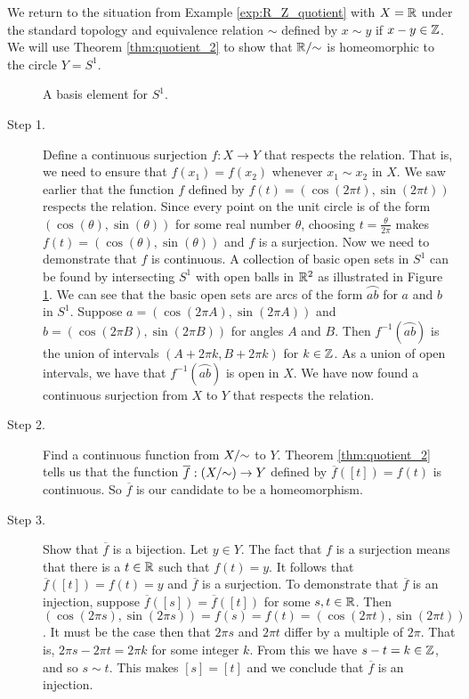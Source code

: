 \begin{example} We return to the situation from Example \ref{exp:R_Z_quotient} with $X = \mathbb{R}$ under the standard topology and equivalence relation $\sim$ defined by $x \sim y$ if $x - y \in \mathbb{Z}$. We will use Theorem \ref{thm:quotient_2} to show that $\mathbb{R}/\hspace{-1mm}\sim$ is homeomorphic to the circle $Y = S^1$. 

\begin{figure}[h]
\begin{center}
\caption{A basis element for $S^1$.} 
\label{F:S_1_basis}
\end{center}
\end{figure}


\begin{description}
\item[Step 1.] Define a continuous surjection $f: X \to Y$ that respects the relation. That is, we need to ensure that $f(x_1) = f(x_2)$ whenever $x_1 \sim x_2$ in $X$. We saw earlier that the function $f$ defined by $f(t) = (\cos(2 \pi t), \sin(2 \pi t))$ respects the relation. Since every point on the unit circle is of the form $(\cos(\theta), \sin(\theta))$ for some real number $\theta$, choosing $t = \frac{\theta}{2 \pi}$ makes $f(t) = (\cos(\theta), \sin(\theta))$ and $f$ is a surjection. Now we need to demonstrate that $f$ is continuous. A collection of basic open sets in $S^1$ can be found by intersecting $S^1$ with open balls in $\mathbb{R}^2$ as illustrated in Figure \ref{F:S_1_basis}. We can see that the basic open sets are arcs of the form $\wideparen{ab}$ for $a$ and $b$ in $S^1$. Suppose $a = (\cos(2 \pi A), \sin(2 \pi A))$ and $b = (\cos(2 \pi B), \sin(2 \pi B))$ for angles $A$ and $B$. Then $f^{-1}(\wideparen{ab})$ is the union of intervals $(A+2\pi k, B+2 \pi k)$ for $k \in \mathbb{Z}$. As a union of open intervals, we have that $f^{-1}(\wideparen{ab})$ is open in $X$. We have now found a continuous surjection from $X$ to $Y$ that respects the relation. 

\item[Step 2.] Find a continuous function from $X/\hspace{-1mm}\sim$ to $Y$. Theorem \ref{thm:quotient_2} tells us that the function $\overline{f} : (X/\hspace{-1mm}\sim) \to Y$ defined by $\overline{f}([t]) = f(t)$ is continuous. So $\overline{f}$ is our candidate to be a homeomorphism. 

\item[Step 3.] Show that $\overline{f}$ is a bijection. Let $y \in Y$. The fact that $f$ is a surjection means that there is a $t \in \mathbb{R}$ such that $f(t) = y$. It follows that $\overline{f}([t]) = f(t) = y$ and $\overline{f}$ is a surjection. To demonstrate that $\overline{f}$ is an injection, suppose $\overline{f}([s]) = \overline{f}([t])$ for some $s, t \in \mathbb{R}$.  Then $(\cos(2 \pi s), \sin(2 \pi s)) = f(s) = f(t) = (\cos(2\pi t), \sin(2 \pi t))$. It must be the case then that $2 \pi s$ and $2 \pi t$ differ by a multiple of $2 \pi$. That is, $2 \pi s - 2 \pi t = 2 \pi k$ for some integer $k$. From this we have $s - t = k \in \mathbb{Z}$, and so $s \sim t$. This makes $[s] = [t]$ and we conclude that $\overline{f}$ is an injection. 


\end{description}
\end{example}
